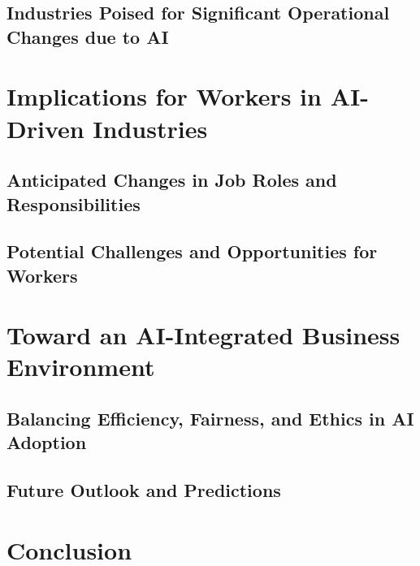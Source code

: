 \documentclass[
]{book}
\begin{document}
\hypertarget{industries-poised-for-significant-operational-changes-due-to-ai}{%
\section{Industries Poised for Significant Operational Changes due to AI}\label{industries-poised-for-significant-operational-changes-due-to-ai}}

\hypertarget{implications-for-workers-in-ai-driven-industries}{%
\chapter{Implications for Workers in AI-Driven Industries}\label{implications-for-workers-in-ai-driven-industries}}

\hypertarget{anticipated-changes-in-job-roles-and-responsibilities}{%
\section{Anticipated Changes in Job Roles and Responsibilities}\label{anticipated-changes-in-job-roles-and-responsibilities}}

\hypertarget{potential-challenges-and-opportunities-for-workers}{%
\section{Potential Challenges and Opportunities for Workers}\label{potential-challenges-and-opportunities-for-workers}}

\hypertarget{toward-an-ai-integrated-business-environment}{%
\chapter{Toward an AI-Integrated Business Environment}\label{toward-an-ai-integrated-business-environment}}

\hypertarget{balancing-efficiency-fairness-and-ethics-in-ai-adoption}{%
\section{Balancing Efficiency, Fairness, and Ethics in AI Adoption}\label{balancing-efficiency-fairness-and-ethics-in-ai-adoption}}

\hypertarget{future-outlook-and-predictions}{%
\section{Future Outlook and Predictions}\label{future-outlook-and-predictions}}

\hypertarget{conclusion}{%
\chapter{Conclusion}\label{conclusion}}

  
\end{document}
